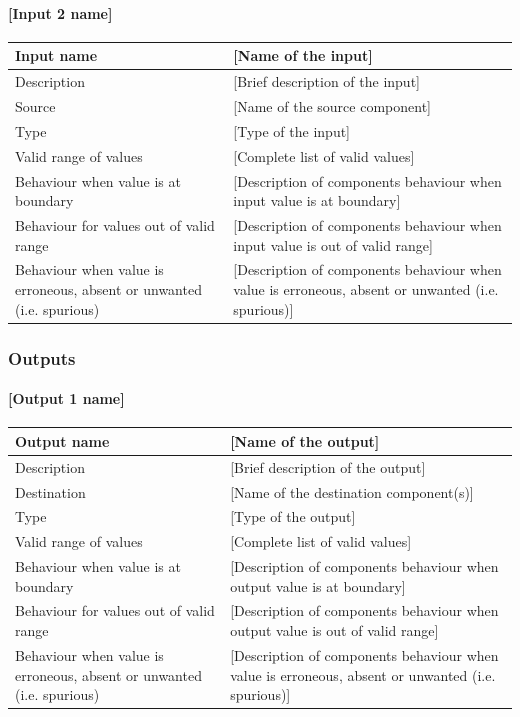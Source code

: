 \paragraph{[Input 2 name]}

\begin{longtable}{p{}p{}}
\toprule
Input name				& [Name of the input] \\
\midrule
Description				& [Brief description of the input] \\
\midrule
Source					& [Name of the source component] \\ 
\midrule
Type					& [Type of the input] \\
\midrule
Valid range of values	& [Complete list of valid values] \\
\midrule
Behaviour when value is at boundary	& [Description of components behaviour when input value is at boundary] \\
\midrule
Behaviour for values out of valid range	& [Description of components behaviour when input value is out of valid range] \\
\midrule
Behaviour when value is erroneous, absent or unwanted (i.e. spurious) & [Description of components behaviour when value is erroneous, absent or unwanted (i.e. spurious)] \\
\bottomrule
\end{longtable}


\subsubsection{Outputs}\label{s:manageTIUInput_outputs}

\paragraph{[Output 1 name]}

\begin{longtable}{p{}p{}}
\toprule
Output name				& [Name of the output] \\
\midrule
Description				& [Brief description of the output] \\
\midrule
Destination				& [Name of the destination component(s)] \\ 
\midrule
Type					& [Type of the output] \\
\midrule
Valid range of values	& [Complete list of valid values] \\
\midrule
Behaviour when value is at boundary	& [Description of components behaviour when output value is at boundary] \\
\midrule
Behaviour for values out of valid range	& [Description of components behaviour when output value is out of valid range] \\
\midrule
Behaviour when value is erroneous, absent or unwanted (i.e. spurious) & [Description of components behaviour when value is erroneous, absent or unwanted (i.e. spurious)] \\
\bottomrule
\end{longtable}


